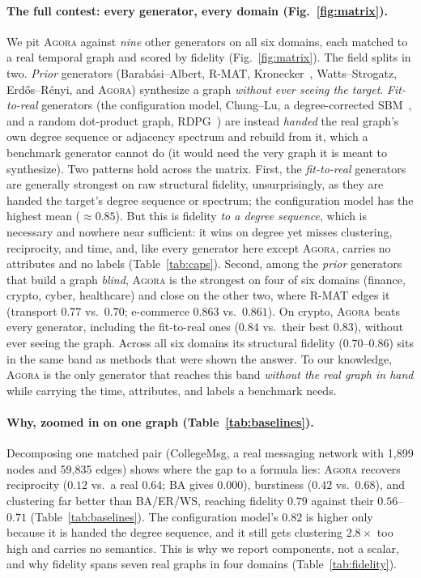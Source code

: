 \documentclass[sigconf,review,anonymous]{acmart}
\newcommand{\sys}{\textsc{Agora}\xspace}
\begin{document}
\paragraph{The full contest: every generator, every domain (Fig.~\ref{fig:matrix}).}
We pit \sys{} against \emph{nine} other generators on all six domains, each matched to
a real temporal graph and scored by fidelity (Fig.~\ref{fig:matrix}). The field splits
in two. \emph{Prior} generators (Barab\'asi--Albert, R-MAT,
Kronecker~\cite{leskovec2010kronecker}, Watts--Strogatz, Erd\H{o}s--R\'enyi, and
\sys) synthesize a graph \emph{without ever seeing the target}. \emph{Fit-to-real}
generators (the configuration model, Chung--Lu, a degree-corrected
SBM~\cite{karrer2011dcsbm}, and a random dot-product graph, RDPG~\cite{athreya2018rdpg})
are instead \emph{handed} the real graph's own degree sequence or adjacency
spectrum and rebuild from it, which a benchmark generator cannot do (it would need the
very graph it is meant to synthesize). Two patterns hold across the matrix. First, the \emph{fit-to-real} generators are
generally strongest on raw structural fidelity, unsurprisingly, as they are handed
the target's degree sequence or spectrum; the configuration model has the highest mean
($\approx\!0.85$). But this is fidelity \emph{to a degree sequence}, which is necessary
and nowhere near sufficient: it wins on degree yet misses clustering, reciprocity, and
time, and, like every generator here except \sys{}, carries no attributes and no
labels (Table~\ref{tab:caps}). Second, among the
\emph{prior} generators that build a graph \emph{blind}, \sys{} is the strongest on
four of six domains (finance, crypto, cyber, healthcare) and close on the other two,
where R-MAT edges it (transport $0.77$ vs.\ $0.70$; e-commerce $0.863$ vs.\ $0.861$).
On crypto, \sys{} beats every generator, including the fit-to-real ones ($0.84$ vs.\
their best $0.83$), without ever seeing the graph. Across all six domains its structural
fidelity ($0.70$--$0.86$) sits in the same band as methods that were shown the answer.
To our knowledge, \sys{} is the only generator that reaches this band \emph{without the
real graph in hand} while carrying the time, attributes, and labels a benchmark needs.

\paragraph{Why, zoomed in on one graph (Table~\ref{tab:baselines}).}
Decomposing one matched pair (CollegeMsg, a real messaging network with 1{,}899 nodes
and 59{,}835 edges) shows where the gap to a formula lies: \sys{} recovers reciprocity
($0.12$ vs.\ a real $0.64$; BA gives $0.000$), burstiness ($0.42$ vs.\ $0.68$), and
clustering far better than BA/ER/WS, reaching fidelity $0.79$ against their
$0.56$--$0.71$ (Table~\ref{tab:baselines}). The configuration model's $0.82$ is higher
only because it is handed the degree sequence, and it still gets clustering
$2.8\times$ too high and carries no semantics. This is why we report components, not a
scalar, and why fidelity spans seven real graphs in four domains (Table~\ref{tab:fidelity}).
\end{document}

